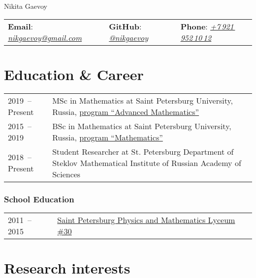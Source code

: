 \documentclass[a4paper, 11pt]{article}
\begin{document}


\begin{center}
    {\Huge Nikita Gaevoy}
\end{center}

\begin{center}
    \begin{tabular}{lll}
        \textbf{Email}: \href{mailto:nikgaevoy@gmail.com}{{\it nikgaevoy@gmail.com}} &
        \hspace{0.13cm} \textbf{GitHub}: \href{https://github.com/nikgaevoy}{{\it @nikgaevoy}} &
        \hspace{0.13cm} \textbf{Phone}: \href{tel:+79219521012}{{\it +7\,921\,952\,10\,12}}
    \end{tabular}
\end{center}

\section*{Education \& Career}

\begin{tabularx}{\textwidth}{lX}
    2019~-- Present & MSc in Mathematics at Saint Petersburg University, Russia, \href{https://math-cs.spbu.ru/en/msc-math-en/}{program ``Advanced Mathematics''} \\
    2015~-- 2019 & BSc in Mathematics at Saint Petersburg University, Russia, \href{https://math-cs.spbu.ru/en/}{program ``Mathematics''} \\
    2018~-- Present & Student Researcher at St. Petersburg Department of Steklov Mathematical Institute of Russian Academy of Sciences \\
\end{tabularx}

\subsubsection*{School Education}

\begin{tabularx}{\textwidth}{lX}
    2011~-- 2015 & \href{http://www.school30.spb.ru/}{Saint Petersburg Physics and Mathematics Lyceum \#30}
\end{tabularx}


\section*{Research interests}
\end{document}
